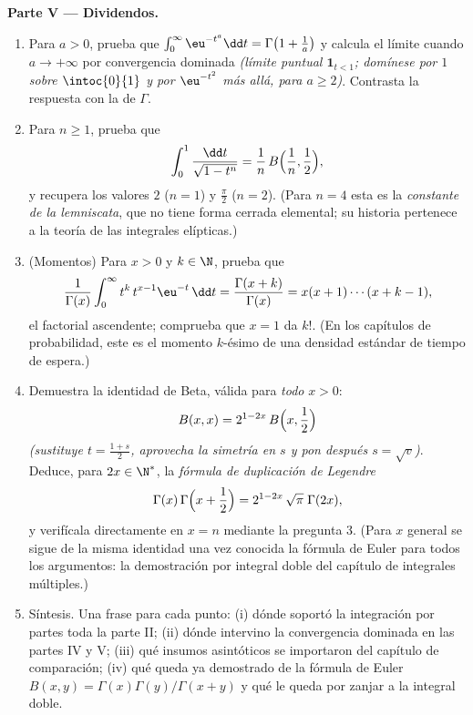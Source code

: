 \begin{problem}
\medskip
\noindent\textbf{Parte V --- Dividendos.}
\begin{enumerate}[resume]
  \item Para $a > 0$, prueba que $\int_0^\infty \eu^{-t^a}\dd t =
        \Gamma\bigl(1 + \frac1a\bigr)$ y calcula el límite cuando $a
        \to +\infty$ por convergencia dominada \emph{(límite puntual
        $\mathbf 1_{t < 1}$; domínese por $1$ sobre $\intoc{0}{1}$ y
        por $\eu^{-t^2}$ más allá, para $a \geq 2$)}. Contrasta la
        respuesta con la  de $\Gamma$.
  \item Para $n \geq 1$, prueba que
        \[
        \int_0^1 \frac{\dd t}{\sqrt{1 - t^n}}
        = \frac1n\,B\Bigl(\frac1n, \frac12\Bigr),
        \]
        y recupera los valores $2$ ($n = 1$) y $\frac\pi2$ ($n =
        2$). (Para $n = 4$ esta es la \emph{constante de la
        lemniscata}, que no tiene forma cerrada elemental; su
        historia pertenece a la teoría de las integrales
        elípticas.)
  \item (Momentos) Para $x > 0$ y $k \in \N$, prueba que
        \[
        \frac{1}{\Gamma(x)}\int_0^\infty
        t^{k}\,t^{x-1}\eu^{-t}\,\dd t
        = \frac{\Gamma(x+k)}{\Gamma(x)}
        = x(x+1)\cdots(x+k-1),
        \]
        el factorial ascendente; comprueba que $x = 1$ da $k!$. (En
        los capítulos de probabilidad, este es el momento $k$-ésimo
        de una densidad estándar de tiempo de espera.)
  \item Demuestra la identidad de Beta, válida para \emph{todo} $x >
        0$:
        \[
        B(x, x) = 2^{1-2x}\,B\Bigl(x, \frac12\Bigr)
        \]
        \emph{(sustituye $t = \frac{1+s}2$, aprovecha la simetría en
        $s$ y pon después $s = \sqrt v$)}. Deduce, para $2x \in
        \N^*$, la \emph{fórmula de duplicación de Legendre}
        \[
        \Gamma(x)\,\Gamma\Bigl(x + \frac12\Bigr)
        = 2^{1-2x}\,\sqrt\pi\;\Gamma(2x),
        \]
        y verifícala directamente en $x = n$ mediante la pregunta 3.
        (Para $x$ general se sigue de la misma identidad una vez
        conocida la fórmula de Euler para todos los argumentos: la
        demostración por integral doble del capítulo de integrales
        múltiples.)
  \item Síntesis. Una frase para cada punto: (i) dónde soportó la
        integración por partes toda la parte II; (ii) dónde
        intervino la convergencia dominada en las partes IV y V;
        (iii) qué insumos asintóticos se importaron del capítulo de
        comparación; (iv) qué queda ya demostrado de la fórmula de
        Euler $B(x,y) = \Gamma(x)\Gamma(y)/\Gamma(x+y)$ y qué le
        queda por zanjar a la integral doble.
\end{enumerate}
\end{problem}
